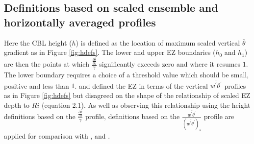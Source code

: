         

\subsection{Definitions based on scaled ensemble and horizontally averaged profiles}

Here the CBL height ($h$) is defined as the location of maximum scaled vertical $\overline{\theta}$ gradient as in Figure \ref{fig:hdefs}.  The lower and upper EZ boundaries ($h_{0}$ and $h_{1}$) are then the points at which $\frac{\frac{\partial \overline{\theta}}{\partial z}}{\gamma}$ significantly exceeds zero and where it resumes $1$.  The lower boundary requires a choice of a threshold value which should be small, positive and less than $1$. \cite{FedConzMir04} and \cite{BrooksFowler2} defined the EZ in terms of the vertical $\overline{w^{'}\theta^{'}}$ profiles as in Figure \ref{fig:hdefs} but disagreed on the shape of the relationship of scaled EZ depth to $Ri$ (equation 2.1).  As well as observing this relationship using the height definitions based on the $\frac{\frac{\partial \overline{\theta}}{\partial z}}{\gamma}$ profile, definitions based on the $\frac{\overline{w^{'}\theta^{'}}}{(\overline{w^{'}\theta^{'}})_{s}}$ profile are applied for comparison with \cite{BrooksFowler2}, \cite{FedConzMir04} and \cite{GarciaMellado}.\\  

        
